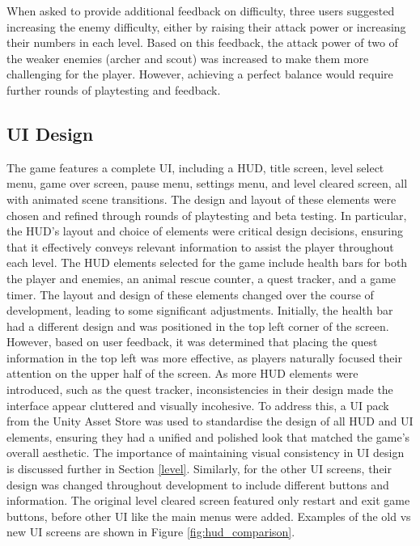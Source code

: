 \documentclass[10pt]{final_report}
\begin{document}
When asked to provide additional feedback on difficulty, three users suggested increasing the enemy difficulty, either by raising their attack power or increasing their numbers in each level. Based on this feedback, the attack power of two of the weaker enemies (archer and scout) was increased to make them more challenging for the player. However, achieving a perfect balance would require further rounds of playtesting and feedback.

\subsection{UI Design}\label{UIDesign}

The game features a complete UI, including a HUD, title screen, level select menu, game over screen, pause menu, settings menu, and level cleared screen, all with animated scene transitions. The design and layout of these elements were chosen and refined through rounds of playtesting and beta testing. In particular, the HUD's layout and choice of elements were critical design decisions, ensuring that it effectively conveys relevant information to assist the player throughout each level.
\newline
The HUD elements selected for the game include health bars for both the player and enemies, an animal rescue counter, a quest tracker, and a game timer. The layout and design of these elements changed over the course of development, leading to some significant adjustments. Initially, the health bar had a different design and was positioned in the top left corner of the screen. However, based on user feedback, it was determined that placing the quest information in the top left was more effective, as players naturally focused their attention on the upper half of the screen.
\newline
As more HUD elements were introduced, such as the quest tracker, inconsistencies in their design made the interface appear cluttered and visually incohesive. To address this, a UI pack from the Unity Asset Store was used to standardise the design of all HUD and UI elements, ensuring they had a unified and polished look that matched the game’s overall aesthetic. The importance of maintaining visual consistency in UI design is discussed further in Section \ref{level}. Similarly, for the other UI screens, their design was changed throughout development to include different buttons and information. The original level cleared screen featured only restart and exit game buttons, before other UI like the main menus were added. Examples of the old vs new UI screens are shown in Figure \ref{fig:hud_comparison}.
\end{document}
